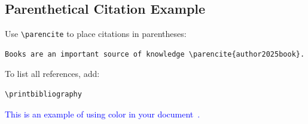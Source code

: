 \subsection{Parenthetical Citation Example}
Use \texttt{\textbackslash parencite} to place citations in parentheses:

\begin{verbatim}
Books are an important source of knowledge \parencite{author2025book}.
\end{verbatim}

To list all references, add:

\begin{verbatim}
\printbibliography
\end{verbatim}

\textcolor{blue}{This is an example of using color in your document~\cite{author2024article,author2023conference}.}
